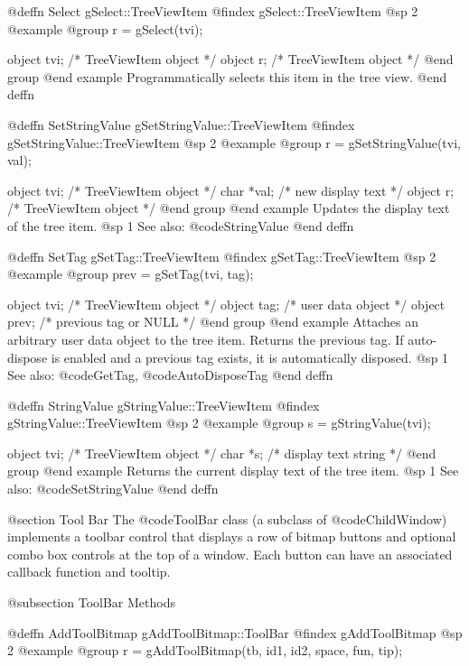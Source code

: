@deffn {Select} gSelect::TreeViewItem
@findex gSelect::TreeViewItem
@sp 2
@example
@group
r = gSelect(tvi);

object  tvi;   /*  TreeViewItem object  */
object  r;     /*  TreeViewItem object  */
@end group
@end example
Programmatically selects this item in the tree view.
@end deffn



@deffn {SetStringValue} gSetStringValue::TreeViewItem
@findex gSetStringValue::TreeViewItem
@sp 2
@example
@group
r = gSetStringValue(tvi, val);

object  tvi;    /*  TreeViewItem object  */
char    *val;   /*  new display text     */
object  r;      /*  TreeViewItem object  */
@end group
@end example
Updates the display text of the tree item.
@sp 1
See also:  @code{StringValue}
@end deffn



@deffn {SetTag} gSetTag::TreeViewItem
@findex gSetTag::TreeViewItem
@sp 2
@example
@group
prev = gSetTag(tvi, tag);

object  tvi;    /*  TreeViewItem object       */
object  tag;    /*  user data object          */
object  prev;   /*  previous tag or NULL      */
@end group
@end example
Attaches an arbitrary user data object to the tree item.  Returns the
previous tag.  If auto-dispose is enabled and a previous tag exists, it
is automatically disposed.
@sp 1
See also:  @code{GetTag}, @code{AutoDisposeTag}
@end deffn



@deffn {StringValue} gStringValue::TreeViewItem
@findex gStringValue::TreeViewItem
@sp 2
@example
@group
s = gStringValue(tvi);

object  tvi;   /*  TreeViewItem object  */
char    *s;    /*  display text string  */
@end group
@end example
Returns the current display text of the tree item.
@sp 1
See also:  @code{SetStringValue}
@end deffn




@section Tool Bar
The @code{ToolBar} class (a subclass of @code{ChildWindow}) implements a
toolbar control that displays a row of bitmap buttons and optional combo
box controls at the top of a window.  Each button can have an associated
callback function and tooltip.

@subsection ToolBar Methods



@deffn {AddToolBitmap} gAddToolBitmap::ToolBar
@findex gAddToolBitmap
@sp 2
@example
@group
r = gAddToolBitmap(tb, id1, id2, space, fun, tip);

